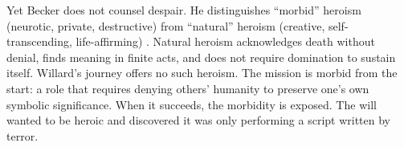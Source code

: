 Yet Becker does not counsel despair. He distinguishes ``morbid'' heroism (neurotic, private,
destructive) from ``natural'' heroism (creative, self-transcending, life-affirming)
\parencite[pp.~153--175]{BeckerDenial1973}. Natural heroism acknowledges death without denial,
finds meaning in finite acts, and does not require domination to sustain itself. Willard's
journey offers no such heroism. The mission is morbid from the start: a role that requires
denying others' humanity to preserve one's own symbolic significance. When it succeeds, the
morbidity is exposed. The will wanted to be heroic and discovered it was only performing a
script written by terror.
